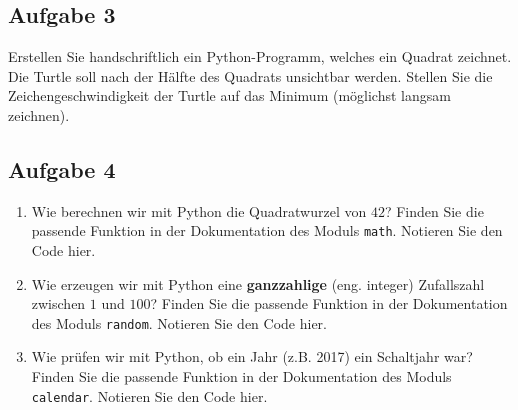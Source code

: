 \subsection{Aufgabe 3}

Erstellen Sie handschriftlich ein Python-Programm, welches ein Quadrat zeichnet. Die Turtle soll nach der Hälfte des Quadrats unsichtbar werden. Stellen Sie die Zeichengeschwindigkeit der Turtle auf das Minimum (möglichst langsam zeichnen).


\newpage

\subsection{Aufgabe 4}

\begin{enumerate}
	\item Wie berechnen wir mit Python die Quadratwurzel von $42$? Finden Sie die passende Funktion in der Dokumentation des Moduls \lstinline{math}. Notieren Sie den Code hier.
	\fillwithgrid{1.5in}
	\item Wie erzeugen wir mit Python eine \textbf{ganzzahlige} (eng. integer) Zufallszahl zwischen $1$ und $100$? Finden Sie die passende Funktion in der Dokumentation des Moduls \lstinline{random}. Notieren Sie den Code hier.
	\fillwithgrid{1.5in}
		\item Wie prüfen wir mit Python, ob ein Jahr (z.B. 2017) ein Schaltjahr war? Finden Sie die passende Funktion in der Dokumentation des Moduls \lstinline{calendar}. Notieren Sie den Code hier.
	\fillwithgrid{1.5in}
\end{enumerate}
